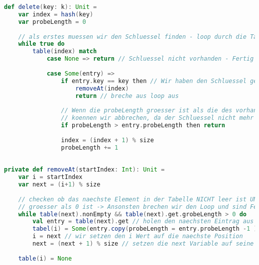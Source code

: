 \begin{lstlisting}[language=Scala]
def delete(key: k): Unit =
	var index = hash(key)
	var probeLength = 0
	
	// als erstes muessen wir den Schluessel finden - loop durch die Tabelle
	while true do
		table(index) match
			case None => return // Schluessel nicht vorhanden - Fertig
			
			case Some(entry) => 
				if entry.key == key then // Wir haben den Schluessel gefunden - Delete
					removeAt(index)
					return // breche aus loop aus
				
				// Wenn die probeLength groesser ist als die des vorhandenen Elements
				// koennen wir abbrechen, da der Schluessel nicht mehr vorkommen kann
				if probeLength > entry.probeLength then return 
				
				index = (index + 1) % size
				probeLength += 1
				
				
private def removeAt(startIndex: Int): Unit =
	var i = startIndex
	var next = (i+1) % size
	
	// checken ob das naechste Element in der Tabelle NICHT leer ist UND ob die probelength
	// groesser als 0 ist -> Ansonsten brechen wir den Loop und sind Fertig
	while table(next).nonEmpty && table(next).get.grobeLength > 0 do
		val entry = table(next).get // holen den naechsten Eintrag aus der Tabelle
		tabel(i) = Some(entry.copy(probeLength = entry.probeLength -1 )) // wir kopieren den naechsten Eintrag auf die jetztige Stelle und verringern seinen PSL Wert
		i = next // wir setzen den i Wert auf die naechste Position
		next = (next + 1) % size // setzen die next Variable auf seine neue Position also + 1
	
	table(i) = None
\end{lstlisting}